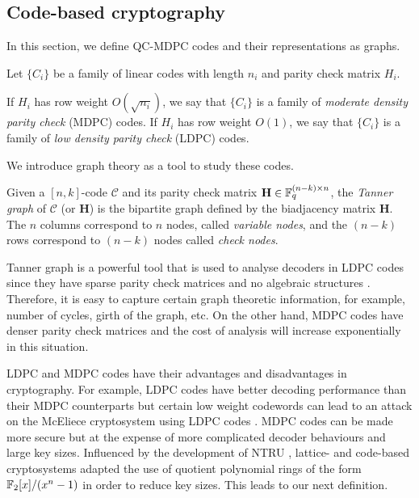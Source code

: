 \subsection{Code-based cryptography}

In this section, we define QC-MDPC codes and their representations as graphs. 

\begin{defn}
Let $\{ C_i \}$ be a family of linear codes with length $n_i$ and parity check matrix $H_i$.

If $H_i$ has row weight $O(\sqrt{n_i})$, we say that $\{C_i\}$ is a family of \textit{moderate density parity check} (MDPC) codes. If $H_i$ has row weight $O(1)$, we say that $\{C_i\}$ is a family of \textit{low density parity check} (LDPC) codes.
\end{defn}

We introduce graph theory as a tool to study these codes.

\begin{defn}
Given a $[n,k]$-code $\mathcal{C}$ and its parity check matrix $\mathbf{H} \in \mathbb{F}_q^{(n-k) \times n}$, the \textit{Tanner graph} of $\mathcal{C}$ (or $\mathbf{H}$) is the bipartite graph defined by the biadjacency matrix $\mathbf{H}$. The $n$ columns correspond to $n$ nodes, called \textit{variable nodes}, and the $(n-k)$ rows correspond to $(n-k)$ nodes called \textit{check nodes}.
\end{defn}

Tanner graph is a powerful tool that is used to analyse decoders in LDPC codes since they have sparse parity check matrices and no algebraic structures \cite{1057683}. Therefore, it is easy to capture certain graph theoretic information, for example, number of cycles, girth of the graph, etc. On the other hand, MDPC codes have denser parity check matrices and the cost of analysis will increase exponentially in this situation.

LDPC and MDPC codes have their advantages and disadvantages in cryptography. For example, LDPC codes have better decoding performance than their MDPC counterparts but certain low weight codewords can lead to an attack on the McEliece cryptosystem using LDPC codes \cite{866513, 4557609,10.1007/978-3-540-85855-3_17}. MDPC codes can be made more secure but at the expense of more complicated decoder behaviours and large key sizes. Influenced by the development of NTRU \cite{ntru}, lattice- and code-based cryptosystems adapted the use of quotient polynomial rings of the form $\mathbb{F}_2[x]/(x^n -1)$ in order to reduce key sizes. This leads to our next definition.

